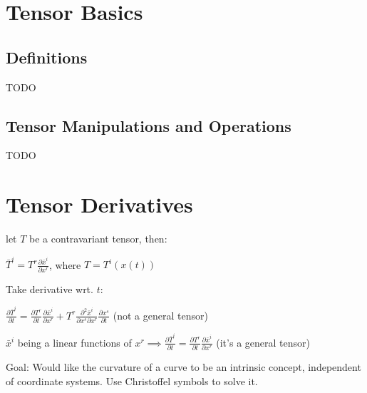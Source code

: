 \documentclass[8pt,letter]{article}
\begin{document}


\begin{multicols*}{2}

  \section{Tensor Basics}

  \subsection{Definitions}
  TODO

  \subsection{Tensor Manipulations and Operations}
  TODO

  \vfill\null
  \pagebreak
    
  \section{Tensor Derivatives}

  let $T$ be a contravariant tensor, then:

  $\bar{T}^i = T^r \frac{\partial \bar{x}^i}{\partial x^r}$, where $T=T^i(x(t))$

  Take derivative wrt. $t$:

  $\frac{\partial \bar{T}^i}{\partial t} = \frac{\partial T^r}{\partial t} \frac{\partial \bar{x}^i}{\partial x^r} + T^r \frac{\partial^2 \bar{x}^i}{\partial x^s \partial x^r} \frac{\partial x^s}{\partial t}$ (not a general tensor)

  $\bar{x}^i$ being a linear functions of $x^r \implies \frac{\partial \bar{T}^i}{\partial t} = \frac{\partial T^r}{\partial t} \frac{\partial \bar{x}^i}{\partial x^r}$ (it's a general tensor)
  
  Goal: Would like the curvature of a curve to be an intrinsic concept, independent of coordinate systems. Use Christoffel symbols to solve it.
  

\end{multicols*}
\end{document}
